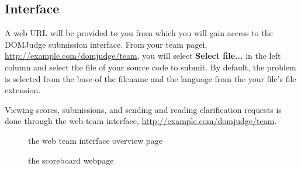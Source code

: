 \documentclass[a4paper]{article}
\begin{document}
\subsection{Interface}
A web URL will be provided to you from which you will gain access to the DOMJudge submission interface. From your team pagei, \url{http://example.com/domjudge/team}, you will select \textbf{Select file...} in the left column and select the file of your source code to submit. By default, the problem is selected from the base of the filename and the language from the your file's file extension. 

Viewing scores, submissions, and sending and reading clarification requests is done through the web team interface, \url{http://example.com/domjudge/team}. 

\begin{figure}[p]
    \centering
    \caption{the web team interface overview page}
    \label{fig:team-overview}
\end{figure}

\begin{figure}[p]
    \centering
    \caption{the scoreboard webpage}
    \label{fig:team-scoreboard}
\end{figure}
\end{document}
